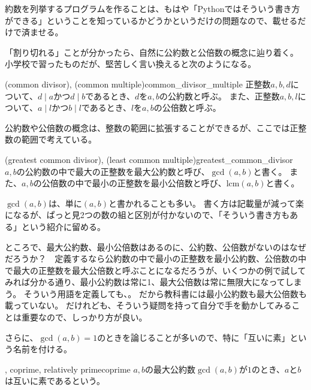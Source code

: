 約数を列挙するプログラムを作ることは、もはや「Pythonではそういう書き方ができる」ということを知っているかどうかというだけの問題なので、載せるだけで済ませる。


「割り切れる」ことが分かったら、自然に公約数と公倍数の概念に辿り着く。
小学校で習ったものだが、堅苦しく言い換えると次のようになる。

\begin{Defi}{(common divisor), (common multiple)}{common_divisor_multiple}
正整数$a, b, d$について、$d \mid a$かつ$ d \mid b$であるとき、$d$を$a,b$の公約数と呼ぶ。
また、正整数$a, b, l$について、$a \mid l$かつ$b \mid l$であるとき、$l$を$a,b$の公倍数と呼ぶ。
\end{Defi}

公約数や公倍数の概念は、整数の範囲に拡張することができるが、ここでは正整数の範囲で考えている。

\begin{Defi}{(greatest common divisor), (least common multiple)}{greatest_common_divisor}
$a,b$の公約数の中で最大の正整数を最大公約数と呼び、$\gcd(a,b)$と書く。
また、$a,b$の公倍数の中で最小の正整数を最小公倍数と呼び、$\mbox{lcm}(a,b)$と書く。
\end{Defi}

$\gcd(a,b)$は、単に$(a,b)$と書かれることも多い。
書く方は記載量が減って楽になるが、ぱっと見2つの数の組と区別が付かないので、「そういう書き方もある」という紹介に留める。

ところで、最大公約数、最小公倍数はあるのに、公約数、公倍数がないのはなぜだろうか？　定義するなら公約数の中で最小の正整数を最小公約数、公倍数の中で最大の正整数を最大公倍数と呼ぶことになるだろうが、いくつかの例で試してみれば分かる通り、最小公約数は常に1、最大公倍数は常に無限大になってしまう。
そういう用語を定義しても、。
だから教科書には最小公約数も最大公倍数も載っていない。
だけれども、そういう疑問を持って自分で手を動かしてみることは重要なので、しっかり方が良い。

さらに、$\gcd(a,b)=1$のときを論じることが多いので、特に「互いに素」という名前を付ける。

\begin{Defi}{, coprime, relatively prime}{coprime}
$a,b$の最大公約数$\gcd(a,b)$が$1$のとき、$a$と$b$は互いに素であるという。
\end{Defi}

